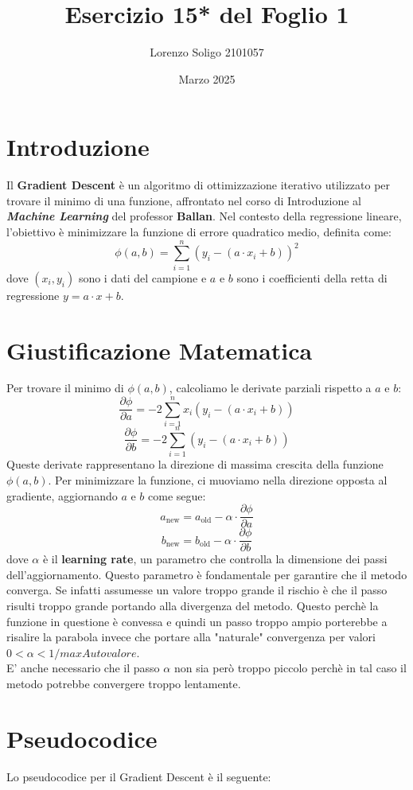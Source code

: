 \documentclass{article}
\title{Esercizio 15* del Foglio 1}
\author{Lorenzo Soligo 2101057}
\date{Marzo 2025}
\begin{document}
\maketitle

\section{Introduzione}
Il \textbf{Gradient Descent} è un algoritmo di ottimizzazione iterativo utilizzato per trovare il minimo di una funzione, affrontato nel corso di Introduzione al \textbf{\textit{Machine Learning}} del professor \textbf{Ballan}. Nel contesto della regressione lineare, l'obiettivo è minimizzare la funzione di errore quadratico medio, definita come:
\[
\phi(a, b) = \sum_{i=1}^n (y_i - (a \cdot x_i + b))^2
\]
dove \((x_i, y_i)\) sono i dati del campione e \(a\) e \(b\) sono i coefficienti della retta di regressione \(y = a \cdot x + b\).

\section{Giustificazione Matematica}
Per trovare il minimo di \(\phi(a, b)\), calcoliamo le derivate parziali rispetto a \(a\) e \(b\):
\[
\frac{\partial \phi}{\partial a} = -2 \sum_{i=1}^n x_i (y_i - (a \cdot x_i + b))
\]
\[
\frac{\partial \phi}{\partial b} = -2 \sum_{i=1}^n (y_i - (a \cdot x_i + b))
\]
Queste derivate rappresentano la direzione di massima crescita della funzione \(\phi(a, b)\). Per minimizzare la funzione, ci muoviamo nella direzione opposta al gradiente, aggiornando \(a\) e \(b\) come segue:
\[
a_{\text{new}} = a_{\text{old}} - \alpha \cdot \frac{\partial \phi}{\partial a}
\]
\[
b_{\text{new}} = b_{\text{old}} - \alpha \cdot \frac{\partial \phi}{\partial b}
\]
dove \(\alpha\) è il \textbf{learning rate}, un parametro che controlla la dimensione dei passi dell'aggiornamento. Questo parametro  è fondamentale per garantire che il metodo converga. Se infatti assumesse un valore troppo grande il rischio è che il passo risulti troppo grande portando alla divergenza del metodo. Questo perchè la funzione in questione è convessa e quindi un passo troppo ampio porterebbe a risalire la parabola invece che portare alla "naturale" convergenza per valori $0<\alpha<1/maxAutovalore$.\\
E' anche necessario che il passo $\alpha$ non sia però troppo piccolo perchè in tal caso il metodo potrebbe convergere troppo lentamente.

\section{Pseudocodice}
Lo pseudocodice per il Gradient Descent è il seguente:
\end{document}
